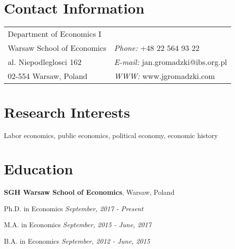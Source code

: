 \documentclass[margin,line]{res}
\newenvironment{list1}{
  \begin{list}{\ding{113}}{%
      \setlength{\itemsep}{0in}
      \setlength{\parsep}{0in} \setlength{\parskip}{0in}
      \setlength{\topsep}{0in} \setlength{\partopsep}{0in} 
      \setlength{\leftmargin}{0.17in}}}{\end{list}}
\newenvironment{list2}{
  \begin{list}{$\bullet$}{%
      \setlength{\itemsep}{0in}
      \setlength{\parsep}{0in} \setlength{\parskip}{0in}
      \setlength{\topsep}{0in} \setlength{\partopsep}{0in} 
      \setlength{\leftmargin}{0.2in}}}{\end{list}}
\begin{document}

\begin{resume}
\section{\sc Contact Information}
\vspace{.05in}
\begin{tabular}{@{}p{2in}p{4in}}            
Department of Economics I   \\         
Warsaw School of Economics & {\it Phone:}  +48 22 564 93 22\\ 
al. Niepodleglosci 162 & {\it E-mail:}  jan.gromadzki@ibs.org.pl\\       
02-554 Warsaw, Poland  & {\it WWW:} www.jgromadzki.com \\     
\end{tabular}


\section{\sc Research Interests}
Labor economics, public economics, political economy, economic history

\section{\sc Education}
{\bf SGH Warsaw School of Economics}, Warsaw, Poland\\
\vspace*{-.1in}
\begin{list1}
\item[] Ph.D. in Economics \textit{\hfill September, 2017 - Present}
\vspace*{.05in}
\item[] M.A. in Economics \hfill \textit{September, 2015 - June, 2017}
\vspace*{.05in}
\item[] B.A. in Economics \hfill \textit{September, 2012 - June, 2015}
\end{list1}


\end{resume}
\end{document}
